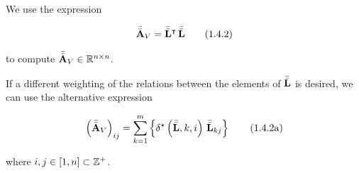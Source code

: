 \documentclass[../../ClusteringConnectionsMAIN.tex]{subfiles}
\begin{document}
\begin{flushleft}
\begin{large}

We use the expression

\begin{align}
\bar{\bar{\mathbf{A}}}_V = \bar{\bar{\mathbf{L}}}^\intercal \, \bar{\bar{\mathbf{L}}} \tag{1.4.2}
\end{align}

to compute $\bar{\bar{\mathbf{A}}}_V \in \mathbb{R}^{n \times n}$. \newline

If a different weighting of the relations between the elements of $\bar{\bar{\mathbf{L}}}$ is desired, we can use the alternative expression

\begin{align}
\left( \bar{\bar{\mathbf{A}}}_V \right)_{ij} = \sum_{k = 1}^m \left\{ \delta^\star \left( \bar{\bar{\mathbf{L}}}, k, i \right) \, \bar{\bar{\mathbf{L}}}_{kj} \right\} \tag{1.4.2a}
\end{align}

where $i, j \in \left[ 1, n \right] \subset \mathbb{Z}^+$.







































\end{large}
\end{flushleft}
\end{document}
